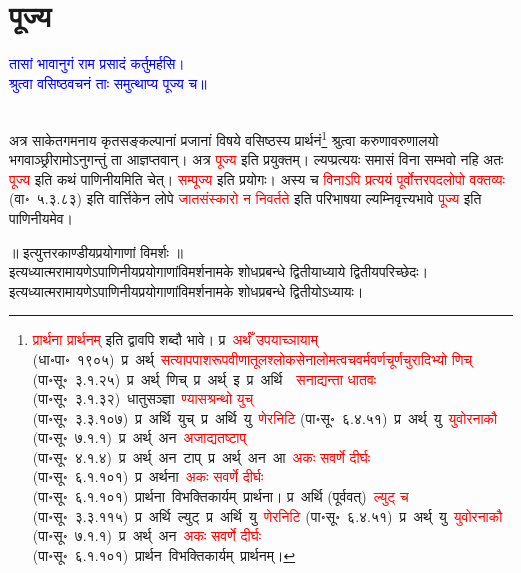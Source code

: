\section[पूज्य]{पूज्य}
\centering\textcolor{blue}{तासां भावानुगं राम प्रसादं कर्तुमर्हसि।\nopagebreak\\
श्रुत्वा वसिष्ठवचनं ताः समुत्थाप्य पूज्य च॥}\nopagebreak\\
\\
\begin{sloppypar}\justifying\noindent\hspace{10mm} अत्र साकेत\-गमनाय कृत\-सङ्कल्पानां प्रजानां विषये वसिष्ठस्य प्रार्थनं\footnote{\textcolor{red}{प्रार्थना प्रार्थनम्} इति द्वावपि शब्दौ भावे। प्र~\textcolor{red}{अर्थँ उपयाच्ञायाम्} (धा॰पा॰~१९०५)~\arrow प्र~अर्थ्~\arrow \textcolor{red}{सत्याप\-पाश\-रूप\-वीणा\-तूल\-श्लोक\-सेना\-लोम\-त्वच\-वर्म\-वर्ण\-चूर्ण\-चुरादिभ्यो णिच्} (पा॰सू॰~३.१.२५)~\arrow प्र~अर्थ्~णिच्~\arrow प्र~अर्थ्~इ~\arrow प्र~अर्थि~\arrow~\arrow \textcolor{red}{सनाद्यन्ता धातवः} (पा॰सू॰~३.१.३२)~\arrow धातु\-सञ्ज्ञा~\arrow \textcolor{red}{ण्यासश्रन्थो युच्} (पा॰सू॰~३.३.१०७)~\arrow प्र~अर्थि~युच्~\arrow प्र~अर्थि~यु~\arrow \textcolor{red}{णेरनिटि} (पा॰सू॰~६.४.५१)~\arrow प्र~अर्थ्~यु~\arrow \textcolor{red}{युवोरनाकौ} (पा॰सू॰~७.१.१)~\arrow प्र~अर्थ्~अन~\arrow \textcolor{red}{अजाद्यतष्टाप्‌} (पा॰सू॰~४.१.४)~\arrow प्र~अर्थ्~अन~टाप्~\arrow प्र~अर्थ्~अन~आ~\arrow \textcolor{red}{अकः सवर्णे दीर्घः} (पा॰सू॰~६.१.१०१)~\arrow प्र~अर्थना~\arrow \textcolor{red}{अकः सवर्णे दीर्घः} (पा॰सू॰~६.१.१०१)~\arrow प्रार्थना~\arrow विभक्तिकार्यम्~\arrow प्रार्थना। प्र~अर्थि (पूर्ववत्)~\arrow \textcolor{red}{ल्युट् च} (पा॰सू॰~३.३.११५)~\arrow प्र~अर्थि~ल्युट्~\arrow प्र~अर्थि~यु~\arrow \textcolor{red}{णेरनिटि} (पा॰सू॰~६.४.५१)~\arrow प्र~अर्थ्~यु~\arrow \textcolor{red}{युवोरनाकौ} (पा॰सू॰~७.१.१)~\arrow प्र~अर्थ्~अन~\arrow \textcolor{red}{अकः सवर्णे दीर्घः} (पा॰सू॰~६.१.१०१)~\arrow प्रार्थन~\arrow विभक्तिकार्यम्~\arrow प्रार्थनम्।} श्रुत्वा करुणा\-वरुणालयो भगवाञ्छ्रीरामोऽनुगन्तुं ता आज्ञप्तवान्। अत्र \textcolor{red}{पूज्य} इति प्रयुक्तम्। ल्यप्प्रत्ययः समासं विना सम्भवो नहि अतः \textcolor{red}{पूज्य} इति कथं पाणिनीयमिति चेत्। \textcolor{red}{सम्पूज्य} इति प्रयोगः। अस्य च \textcolor{red}{विनाऽपि प्रत्ययं पूर्वोत्तर\-पद\-लोपो वक्तव्यः} (वा॰~५.३.८३) इति वार्त्तिकेन लोपे \textcolor{red}{जात\-संस्कारो न निवर्तते} इति परिभाषया ल्यम्निवृत्त्यभावे \textcolor{red}{पूज्य} इति पाणिनीयमेव।\end{sloppypar}
\begin{sloppypar}\justifying\noindent\hspace{10mm} \end{sloppypar}
\vspace{2mm}
\centering ॥ इत्युत्तरकाण्डीयप्रयोगाणां विमर्शः ॥\nopagebreak\\
\vspace{4mm}
\centering इत्यध्यात्म\-रामायणेऽपाणिनीय\-प्रयोगाणां\-विमर्श\-नामके शोध\-प्रबन्धे द्वितीयाध्याये द्वितीय\-परिच्छेदः।\nopagebreak\\
\vspace{4mm}
\centering इत्यध्यात्म\-रामायणेऽपाणिनीय\-प्रयोगाणां\-विमर्श\-नामके शोध\-प्रबन्धे द्वितीयोऽध्यायः।
